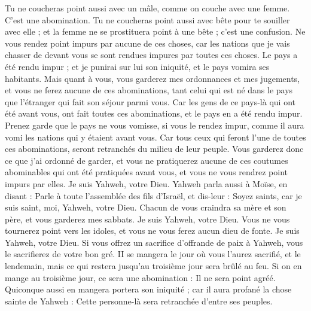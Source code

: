 \begin{multicols}{2}
Tu ne coucheras point aussi avec un mâle, comme on couche avec une femme. C'est une abomination.
Tu ne coucheras point aussi avec bête pour te souiller avec elle ; et la femme ne se prostituera point à une bête ; c’est une confusion.
Ne vous rendez point impurs par aucune de ces choses, car les nations que je vais chasser de devant vous se sont rendues impures par toutes ces choses.
Le pays a été rendu impur ; et je punirai sur lui son iniquité, et le pays vomira ses habitants.
Mais quant à vous, vous garderez mes ordonnances et mes jugements, et vous ne ferez aucune de ces abominations, tant celui qui est né dans le pays que l'étranger qui fait son séjour parmi vous.
Car les gens de ce pays-là qui ont été avant vous, ont fait toutes ces abominations, et le pays en a été rendu impur.
Prenez garde que le pays ne vous vomisse, si vous le rendez impur, comme il aura vomi les nations qui y étaient avant vous.
Car tous ceux qui feront l'une de toutes ces abominations, seront retranchés du milieu de leur peuple.
Vous garderez donc ce que j'ai ordonné de garder, et vous ne pratiquerez aucune de ces coutumes abominables qui ont été pratiquées avant vous, et vous ne vous rendrez point impurs par elles. Je suis Yahweh, votre Dieu.
\VerseOne{}Yahweh parla aussi à Moïse, en disant :
Parle à toute l'assemblée des fils d'Israël, et dis-leur : Soyez saints, car je suis saint, moi, Yahweh, votre Dieu.
Chacun de vous craindra sa mère et son père, et vous garderez mes sabbats. Je suis Yahweh, votre Dieu.
Vous ne vous tournerez point vers les idoles, et vous ne vous ferez aucun dieu de fonte. Je suis Yahweh, votre Dieu.
Si vous offrez un sacrifice d'offrande de paix à Yahweh, vous le sacrifierez de votre bon gré.
II se mangera le jour où vous l'aurez sacrifié, et le lendemain, mais ce qui restera jusqu'au troisième jour sera brûlé au feu.
Si on en mange au troisième jour, ce sera une abomination : Il ne sera point agréé.
Quiconque aussi en mangera portera son iniquité ; car il aura profané la chose sainte de Yahweh : Cette personne-là sera retranchée d'entre ses peuples.

\end{multicols}
